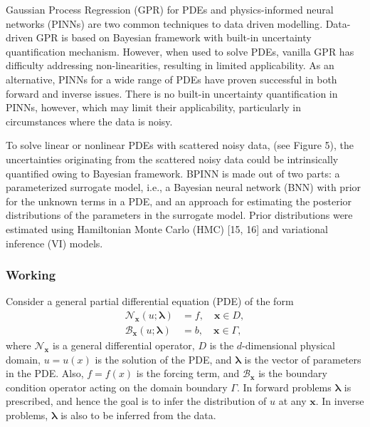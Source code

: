 \documentclass[conference,compsoc]{IEEEtran}
\begin{document}
Gaussian Process Regression (GPR) for PDEs and physics-informed neural networks (PINNs) are two common techniques to data driven modelling\cite{yang2021b}. Data-driven GPR is based on Bayesian framework with built-in uncertainty quantification mechanism\cite{zhang2019quantifying}. However, when used to solve PDEs, vanilla GPR has difficulty addressing non-linearities, resulting in limited applicability. As an alternative, PINNs for a wide range of PDEs have proven successful in both forward and inverse issues\cite{kharazmi2019variational}\cite{raissi2019physics}. There is no built-in uncertainty quantification in PINNs, however, which may limit their applicability, particularly in circumstances where the data is noisy.


To solve linear or nonlinear PDEs with scattered noisy data, (see Figure 5), the uncertainties originating from the scattered noisy data could be intrinsically quantified owing to Bayesian framework\cite{yang2021b}\cite{kharazmi2019variational}. BPINN is made out of two parts: a  parameterized  surrogate  model,  i.e.,  a  Bayesian neural  network  (BNN)  with  prior  for  the  unknown  terms  in  a  PDE,  and  an  approach for estimating the posterior distributions of the parameters in the surrogate model\cite{yang2021b}. Prior distributions were estimated using Hamiltonian Monte Carlo (HMC) [15, 16] and variational inference (VI) models\cite{kharazmi2019variational}.





\subsubsection{Working}

Consider a general partial differential equation (PDE)  of the form 
\begin{equation}
\begin{aligned}
    \mathcal{N}_{\boldsymbol{x}}(u;\boldsymbol{\lambda}) &= f, \quad \boldsymbol{x}\in D, \\
    \mathcal{B}_{\boldsymbol{x}}(u;\boldsymbol{\lambda}) & = b, \quad \boldsymbol{x} \in \Gamma,
\end{aligned}
\end{equation}
where $\mathcal{N}_{\boldsymbol{x}}$ is a general differential operator, $D$ is the $d$-dimensional physical domain, $u = u(x)$ is the solution of the PDE, and $\boldsymbol{\lambda}$ is the vector of parameters in the PDE\cite{yang2021b}. 
Also, $f = f(x)$ is the forcing term, and $\mathcal{B}_{\boldsymbol{x}}$ is the boundary condition operator acting on the domain boundary $\Gamma$. In forward problems $\boldsymbol{\lambda}$ is prescribed, and hence the goal is to infer the distribution of $u$ at any $\boldsymbol{x}$. In inverse problems, $\boldsymbol{\lambda}$ is also to be inferred from the data\cite{yang2021b}\cite{xu2019neural}.
\end{document}
